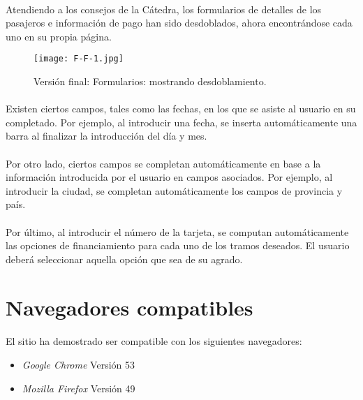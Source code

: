 \documentclass[spanish]{article}
\begin{document}
	\paragraph{} Atendiendo a los consejos de la Cátedra, los formularios de detalles de los pasajeros e información de pago han sido desdoblados, ahora encontrándose cada uno en su propia página. 
			\begin{figure}[h]
				\centering
				\texttt{[image: F-F-1.jpg]}
				\caption{Versión final: Formularios: mostrando desdoblamiento.}
			\end{figure}
	\paragraph{} Existen ciertos campos, tales como las fechas, en los que se asiste al usuario en su completado. Por ejemplo, al introducir una fecha, se inserta automáticamente una barra al finalizar la introducción del día y mes. 
	\paragraph{} Por otro lado, ciertos campos se completan automáticamente en base a la información introducida por el usuario en campos asociados. Por ejemplo, al introducir la ciudad, se completan automáticamente los campos de provincia y país. 
	\paragraph{} Por último, al introducir el número de la tarjeta, se computan automáticamente las opciones de financiamiento para cada uno de los tramos deseados. El usuario deberá seleccionar aquella opción que sea de su agrado. 
	\section{Navegadores compatibles}
	\paragraph{} El sitio ha demostrado ser compatible con los siguientes navegadores:
	\begin{itemize}
		\item \textit{Google Chrome} Versión 53
		\item \textit{Mozilla Firefox} Versión 49
	\end{itemize}
\end{document}
